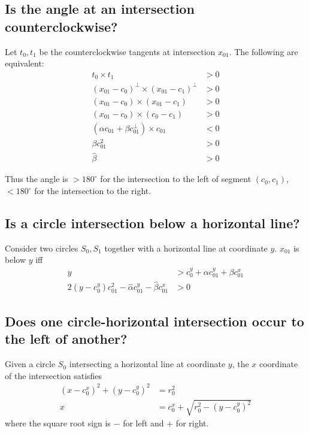 \documentclass[11pt]{article}
\newcommand{\halpha}{\hat{\alpha}}
\newcommand{\hbeta}{\hat{\beta}}
\begin{document}
\subsection{Is the angle at an intersection counterclockwise?}

Let $t_0, t_1$ be the counterclockwise tangents at intersection $x_{01}$.  The following are equivalent:
\begin{align*}
t_0 \times t_1 &> 0 \\
(x_{01} - c_0)^\perp \times (x_{01} - c_1)^\perp &> 0 \\
(x_{01} - c_0) \times (x_{01} - c_1) &> 0 \\
(x_{01} - c_0) \times (c_0 - c_1) &> 0 \\
(\alpha c_{01} + \beta c_{01}^\perp) \times c_{01} &< 0 \\
\beta c_{01}^2 &> 0 \\
\hbeta &> 0
\end{align*}

Thus the angle is $> 180^\circ$ for the intersection to the left of segment $(c_0,c_1)$, $< 180^\circ$ for the intersection to the right.

\subsection{Is a circle intersection below a horizontal line?}

Consider two circles $S_0, S_1$ together with a horizontal line at coordinate $y$.  $x_{01}$ is below $y$ iff
\begin{align*}
y &> c_0^y + \alpha c_{01}^y + \beta c_{01}^x \\
2 (y-c_0^y) c_{01}^2 - \halpha c_{01}^y - \hbeta c_{01}^x &> 0
\end{align*}

\subsection{Does one circle-horizontal intersection occur to the left of another?}

Given a circle $S_0$ intersecting a horizontal line at coordinate $y$, the $x$ coordinate of the intersection satisfies
\begin{align*}
(x-c_0^x)^2 + (y-c_0^y)^2 &= r_0^2 \\
x &= c_0^x + \sqrt{r_0^2 - (y-c_0^y)^2}
\end{align*}
where the square root sign is $-$ for left and $+$ for right.
\end{document}
